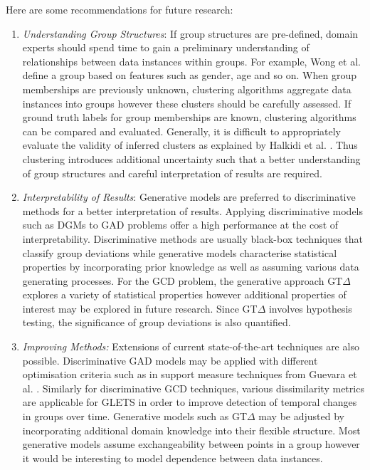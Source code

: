    Here are some recommendations for future research:
 \begin{enumerate}
\item {\it Understanding Group Structures}:
 If group structures are pre-defined, domain experts should spend time to gain a preliminary understanding of relationships between data instances within groups.  For example,  Wong et al. \cite{wong-rule}  define a group based on features such as gender, age and so on. 
 When group memberships are previously unknown, clustering algorithms aggregate data instances into groups however these clusters should be carefully assessed. 
If ground truth labels for group memberships are known, %
 clustering algorithms can be compared and  evaluated. Generally, it is difficult to appropriately evaluate the validity of inferred clusters  as explained by  Halkidi et al. \cite{ClusterValidity}. 
 Thus clustering  introduces additional uncertainty such that a better understanding of group structures and  careful interpretation of results are required.   
  \item {\it Interpretability of Results}: %
Generative models are preferred to  discriminative methods for a better interpretation of results.  Applying discriminative models such as DGMs to GAD problems offer a high performance at the cost of interpretability.   Discriminative methods are usually black-box techniques that classify group deviations while %
 generative models  characterise statistical properties  by incorporating prior knowledge  as well as  assuming various data generating processes. %
 For the GCD problem, the generative approach GT$\Delta$ explores a variety of statistical properties however additional properties of interest may be explored in future research. Since GT$\Delta$ involves hypothesis testing, the significance of group deviations is also quantified.   
%
\item {\it Improving Methods:} Extensions of current state-of-the-art techniques are also possible.  Discriminative GAD models may be applied with different optimisation criteria such as in support measure  techniques  from Guevara et al. \cite{SMDD}. Similarly for  discriminative GCD techniques, various  dissimilarity metrics are applicable for GLETS  \cite{GLETS} in order to improve detection of temporal changes in groups over time.  Generative models such as GT$\Delta$ may be adjusted by incorporating additional domain  knowledge into their flexible structure. Most generative models assume exchangeability between points in a group however it  would be interesting to model  dependence between data instances.     

\end{enumerate}
